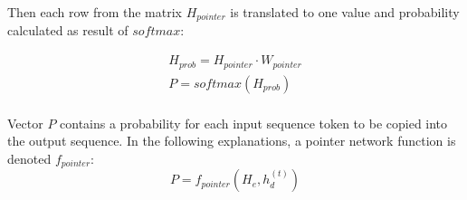 Then each row from the matrix $H_{pointer}$ is translated to one value and probability calculated as result of $softmax$:

\begin{equation}
    \begin{gathered}
    
    H_{prob} = H_{pointer} \cdot W_{pointer}\\
    
    P = softmax(H_{prob})\\
    
    \end{gathered}
\end{equation}

Vector $P$ contains a probability for each input sequence token to be copied into the output sequence. In the following explanations, a pointer network function is denoted $f_{pointer}$:
\begin{equation}
    P = f_{pointer}(H_e, h_d^{(t)})
\end{equation}